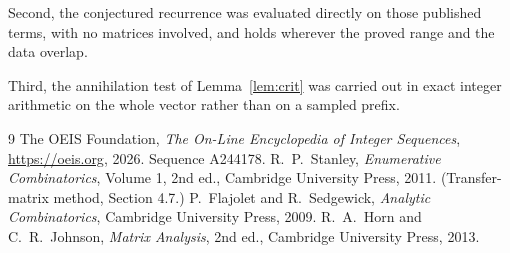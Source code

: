 \documentclass[11pt,a4paper]{article}
\theoremstyle{plain}
\theoremstyle{definition}
\begin{document}
Second, the conjectured recurrence was evaluated directly on those published terms, with no
matrices involved, and holds wherever the proved range and the data overlap.

Third, the annihilation test of Lemma~\ref{lem:crit} was carried out in exact integer
arithmetic on the whole vector rather than on a sampled prefix.

\begin{thebibliography}{9}
 The OEIS Foundation, \emph{The On-Line Encyclopedia of Integer
Sequences}, \url{https://oeis.org}, 2026. Sequence A244178.
 R.~P.~Stanley, \emph{Enumerative Combinatorics}, Volume 1, 2nd ed.,
Cambridge University Press, 2011. (Transfer-matrix method, Section 4.7.)
 P.~Flajolet and R.~Sedgewick, \emph{Analytic Combinatorics}, Cambridge
University Press, 2009.
 R.~A.~Horn and C.~R.~Johnson, \emph{Matrix Analysis}, 2nd ed., Cambridge
University Press, 2013.
\end{thebibliography}
\end{document}
